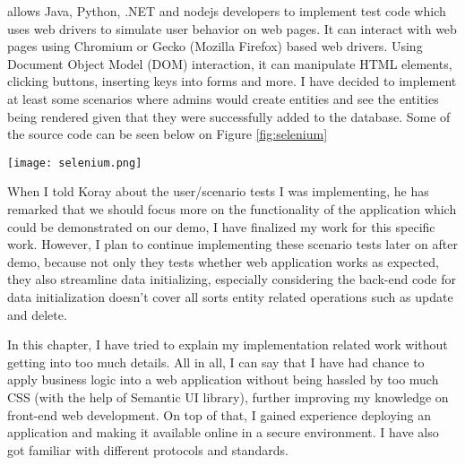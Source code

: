 allows Java, Python, .NET and nodejs developers to implement test code which 
uses web drivers to simulate user behavior on web pages. It can interact with 
web pages using Chromium or Gecko (Mozilla Firefox) based web drivers. Using 
Document Object Model (DOM) interaction, it can manipulate HTML elements, 
clicking buttons, inserting keys into forms and more. I have decided to 
implement at least some scenarios where admins would create entities and 
see the entities being rendered given that they were successfully added to 
the database. Some of the source code can be seen below on Figure 
\ref{fig:selenium}
\begin{figure*}[b!]
    \centering
    \texttt{[image: selenium.png]}
    \caption{Selenium source code to add a cluster.}
    \label{fig:selenium}
\end{figure*}
When I told Koray about the user/scenario tests I was implementing, he has 
remarked that we should focus more on the functionality of the application 
which could be demonstrated on our demo, I have finalized my work for this 
specific work. However, I plan to continue implementing these scenario tests 
later on after demo, because not only they tests whether web application 
works as expected, they also streamline data initializing, especially 
considering the back-end code for data initialization doesn't cover all sorts 
entity related operations such as update and delete.
\par
In this chapter, I have tried to explain my implementation related work 
without getting into too much details. All in all, I can say that I have 
had chance to apply business logic into a web application without being 
hassled by too much CSS (with the help of Semantic UI library), further 
improving my knowledge on front-end web development. On top of that, I gained 
experience deploying an application and making it available online in a secure 
environment. I have also got familiar with different protocols and standards.